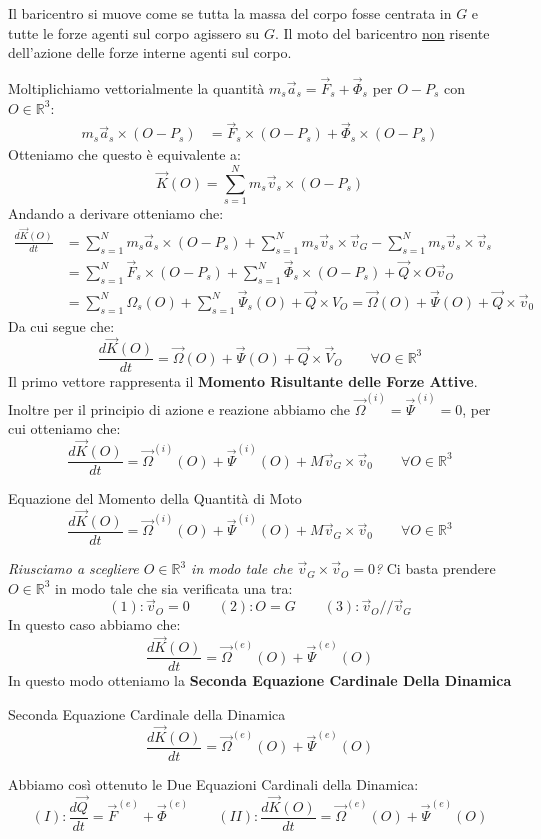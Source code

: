 \documentclass[11pt,a4paper,twoside]{article}
\theoremstyle{definition}
\begin{document}
Il baricentro si muove come se tutta la massa del corpo fosse centrata in $G$ e tutte le forze agenti sul corpo agissero su $G$. Il moto del baricentro \underline{non} risente dell'azione delle forze interne agenti sul corpo.

Moltiplichiamo vettorialmente la quantità $m_s\vec a_s = \vec F_s + \vec \Phi_s$ per $O-P_s$ con $O \in \mathbb R^3$:
\begin{align*}
	m_s \vec a_s \times (O-P_s) &= \vec F_s \times (O-P_s) + \vec \Phi_s \times (O-P_s)
\end{align*}
Otteniamo che questo è equivalente a:
\[ \vec K(O) = \sum_{s =1}^N m_s \vec v_s \times (O-P_s) \]
Andando a derivare otteniamo che:
\begin{align*}
	\frac{d\vec K(O)}{dt} &= \sum_{s = 1}^N m_s\vec a_s \times (O-P_s) + \sum_{s=1}^N m_s \vec v_s \times \vec v_G - \sum_{s = 1}^N m_s \vec v_s \times \vec v_s\\
	&= \sum_{s = 1}^N \vec F_s \times (O-P_s) + \sum_{s = 1}^N \vec \Phi_s \times (O-P_s) + \vec Q \times O \vec v_O\\
	&= \sum_{s=1}^N \Omega_s(O) + \sum_{s = 1}^N \vec \Psi_s(O) + \vec Q \times V_O = \vec \Omega(O) + \vec \Psi(O) + \vec Q \times \vec v_0
\end{align*}
Da cui segue che:
\[ \frac{d\vec K(O)}{dt} = \vec \Omega(O) + \vec \Psi(O) + \vec Q \times \vec V_O \qquad \forall O \in\mathbb R^3\]
Il primo vettore rappresenta il \textbf{Momento Risultante delle Forze Attive}. Inoltre per il principio di azione e reazione abbiamo che $\vec \Omega^{(i)} = \vec \Psi^{(i)} = 0$, per cui otteniamo che:
\[ \frac{d\vec K(O)}{dt} = \vec \Omega^{(i)}(O) + \vec \Psi^{(i)}(O) + M \vec v_G \times \vec v_0 \qquad \forall O \in \mathbb R^3\]
\begin{thm}{Equazione del Momento della Quantità di Moto}{}
	\[ \frac{d\vec K(O)}{dt} = \vec \Omega^{(i)}(O) + \vec \Psi^{(i)}(O) + M \vec v_G \times \vec v_0 \qquad \forall O \in \mathbb R^3\]
\end{thm}
\textit{Riusciamo a scegliere $O \in \mathbb R^3$ in modo tale che $\vec v_G \times \vec v_O = 0$?} Ci basta prendere $O \in \mathbb R^3$ in modo tale che sia verificata una tra:
\[ (1):\vec v_O = 0 \qquad (2):O = G \qquad (3):\vec v_O /\!/ \vec v_G \]
In questo caso abbiamo che:
\[ \frac{d\vec K(O)}{dt} = \vec \Omega^{(e)}(O) + \vec \Psi^{(e)}(O) \]
In questo modo otteniamo la \textbf{Seconda Equazione Cardinale Della Dinamica}
\begin{thm}{Seconda Equazione Cardinale della Dinamica}{}
	\[ \frac{d\vec K(O)}{dt} = \vec \Omega^{(e)}(O) + \vec \Psi^{(e)}(O) \]
\end{thm}
Abbiamo così ottenuto le Due Equazioni Cardinali della Dinamica:
\[ (I):\frac{d\vec Q}{dt} = \vec F^{(e)} + \vec \Phi^{(e)}\qquad (II):\frac{d\vec K(O)}{dt} = \vec \Omega^{(e)}(O) + \vec \Psi^{(e)}(O) \]
\end{document}
